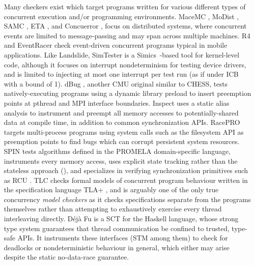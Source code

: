Many checkers exist which target programs written for various different types of
concurrent execution and/or programming environments.
MaceMC \cite{macemc}, MoDist \cite{modist}, SAMC \cite{samc}, ETA \cite{dbug-retreat}, and Concuerror \cite{concuerror},
focus on distributed systems, where concurrent events are limited to message-passing and may span across multiple machines.
R4 \cite{r4} and EventRacer \cite{eventracer} check event-driven concurrent programs typical in mobile applications.
Like Landslide, SimTester \cite{simtester} is a Simics~\cite{simics}-based tool for kernel-level code,
although it focuses on interrupt nondeterminism for testing device drivers,
and is limited to injecting at most one interrupt per test run (as if under ICB with a bound of 1).
%
dBug \cite{dbug-ssv}, another CMU original similar to CHESS,
tests natively-executing programs
using a dynamic library preload to insert preemption points at pthread and MPI interface boundaries.
Inspect \cite{inspect} uses a static alias analysis to instrument and preempt all memory accesses to potentially-shared data
at compile time, in addition to common synchronization APIs.
RacePRO~\cite{racepro} targets multi-process programs using system calls such as the filesystem API as preemption points
to find bugs which can corrupt persistent system resources.
SPIN \cite{spin} tests algorithms defined in the PROMELA domain-specific language,
instruments every memory access,
uses explicit state tracking rather than the stateless approach (\sect{\ref{sec:overview-stateless}}),
and specializes in verifying synchronization primitives such as RCU \cite{rcu}.
TLC \cite{tlc} checks formal models of concurrent program behaviour
written in the specification language TLA+ \cite{tlaplus},
and is arguably one of the only true concurrency {\em model checkers}
as it checks specifications separate from the programs themselves
rather than attempting to exhaustively exercise every thread interleaving directly.
%
D\'{e}j\`{a} Fu \cite{dejafu} is a SCT
for the Haskell language,
whose strong type system guarantees that thread communication be confined to trusted, type-safe APIs.
It instruments these interfaces (STM among them)
to check for deadlocks or nondeterministic behaviour in general,
which either may arise despite the static no-data-race guarantee.

